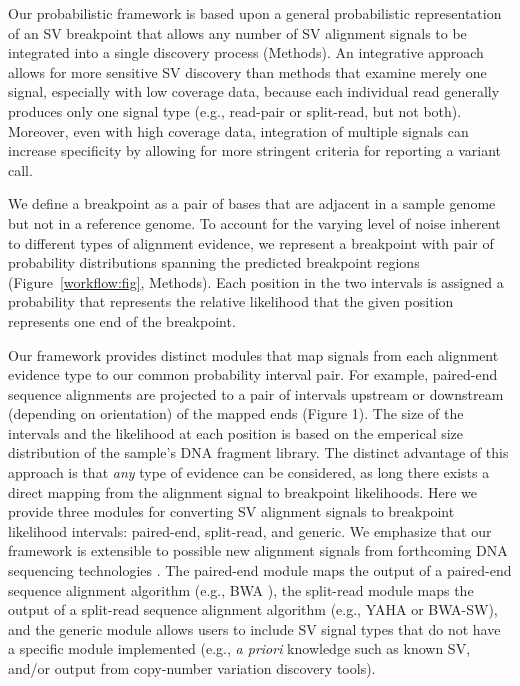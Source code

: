 \documentclass[10pt]{bmc_article}
\newenvironment{bmcformat}{\begin{raggedright}\baselineskip20pt\sloppy\setboolean{publ}{false}}{\end{raggedright}\baselineskip20pt\sloppy}
\begin{document}
\begin{bmcformat}
Our probabilistic framework is based upon a general probabilistic representation
of an SV breakpoint that allows any number of SV alignment signals to be
integrated into a single discovery process (Methods). An integrative approach
allows for more sensitive SV discovery than methods that examine merely one
signal, especially with low coverage data, because each individual read
generally produces only one signal type (e.g., read-pair or split-read, but not
both). Moreover, even with high coverage data, integration of multiple signals
can increase specificity by allowing for more stringent criteria for reporting a
variant call.

We define a breakpoint as a pair of bases that are adjacent in a sample genome
but not in a reference genome. To account for the varying level of noise
inherent to different types of alignment evidence, we represent a breakpoint
with pair of probability distributions spanning the predicted breakpoint regions
(Figure~\ref{workflow:fig}, Methods). Each position in the two intervals is
assigned a probability that represents the relative likelihood that the given
position represents one end of the breakpoint.

Our framework provides distinct modules that map signals from each alignment
evidence type to our common probability interval pair.  For example, paired-end
sequence alignments are projected to a pair of intervals upstream or downstream
(depending on orientation) of the mapped ends (Figure 1).  The size of the
intervals and the likelihood at each position is based on the emperical size
distribution of the sample's DNA fragment library.  The distinct advantage of
this approach is that \emph{any} type of evidence can be considered, as long
there exists a direct mapping from the alignment signal to breakpoint
likelihoods.  Here we provide three modules for converting SV alignment signals
to breakpoint likelihood intervals: paired-end, split-read, and generic.  We
emphasize that our framework is extensible to possible new alignment signals
from forthcoming DNA sequencing technologies \cite{clarke2009}. The paired-end
module maps the output of a paired-end sequence alignment algorithm
(e.g., BWA \cite{li2009a}), the split-read module maps the output of a
split-read sequence alignment algorithm (e.g., YAHA\cite{faust2012} or
BWA-SW\cite{li2010}), and the generic module allows users to include
SV signal types that do not have a specific module implemented (e.g.,
\emph{a priori} knowledge such as known SV, and/or output from
copy-number variation discovery tools).


\end{bmcformat}
\end{document}

